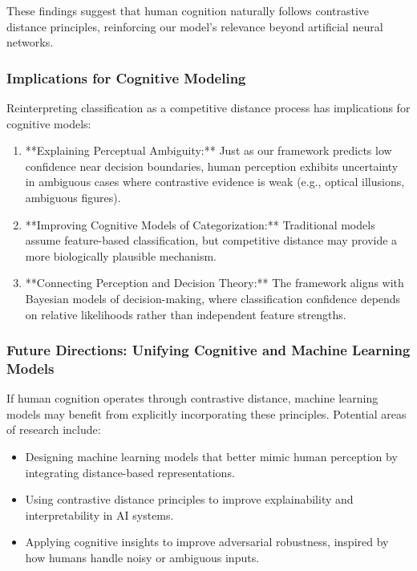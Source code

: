\documentclass[12pt]{article}
\begin{document}
These findings suggest that human cognition naturally follows contrastive distance principles, reinforcing our model's relevance beyond artificial neural networks.

\subsubsection{Implications for Cognitive Modeling}

Reinterpreting classification as a competitive distance process has implications for cognitive models:

\begin{enumerate}
    \item **Explaining Perceptual Ambiguity:** Just as our framework predicts low confidence near decision boundaries, human perception exhibits uncertainty in ambiguous cases where contrastive evidence is weak (e.g., optical illusions, ambiguous figures).
    \item **Improving Cognitive Models of Categorization:** Traditional models assume feature-based classification, but competitive distance may provide a more biologically plausible mechanism.
    \item **Connecting Perception and Decision Theory:** The framework aligns with Bayesian models of decision-making, where classification confidence depends on relative likelihoods rather than independent feature strengths.
\end{enumerate}

\subsubsection{Future Directions: Unifying Cognitive and Machine Learning Models}

If human cognition operates through contrastive distance, machine learning models may benefit from explicitly incorporating these principles. Potential areas of research include:

\begin{itemize}
    \item Designing machine learning models that better mimic human perception by integrating distance-based representations.
    \item Using contrastive distance principles to improve explainability and interpretability in AI systems.
    \item Applying cognitive insights to improve adversarial robustness, inspired by how humans handle noisy or ambiguous inputs.
\end{itemize}
\end{document}
